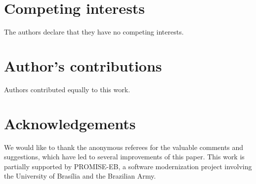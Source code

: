 \documentclass[twocolumn]{bmcart}%
\begin{document}
\begin{backmatter}

\section{Competing interests}
  The authors declare that they have no competing interests.

\section{Author's contributions}

  Authors contributed equally to this work. 

\section{Acknowledgements}
We would like to thank the anonymous referees for the valuable comments and suggestions, which have led to several improvements of this paper. This work is partially supported by \textsc{PROMISE-EB}, a software modernization project involving the University of Bras\'{i}lia and the Brazilian Army.
  
  
  




\end{backmatter}
\end{document}
